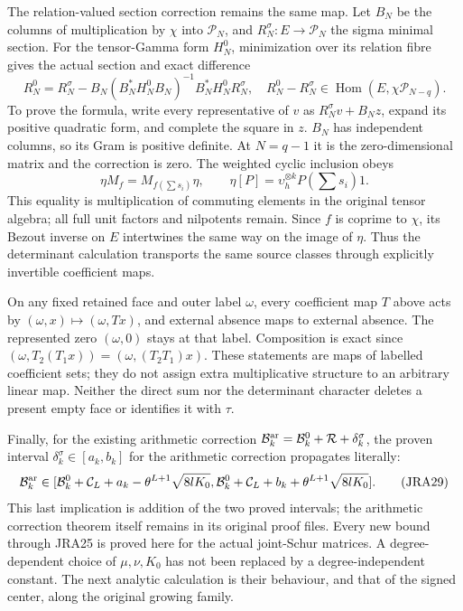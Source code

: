 \documentclass[11pt,a4paper]{article}
\begin{document}
The relation-valued section correction remains the same map.
Let $B_N$ be the columns of multiplication by $\chi$ into $\mathcal P_N$,
and $R_N^\sigma:E\to\mathcal P_N$ the sigma minimal section.
For the tensor-Gamma form $H_N^0$, minimization over its relation fibre
gives the actual section and exact difference
\begin{equation}
 R_N^0=R_N^\sigma-B_N(B_N^*H_N^0B_N)^{-1}B_N^*H_N^0R_N^\sigma,
 \quad
 R_N^0-R_N^\sigma\in\operatorname{Hom}(E,\chi\mathcal P_{N-q}).
 \tag{JRA27}
\end{equation}
To prove the formula, write every representative of $v$ as
$R_N^\sigma v+B_Nz$, expand its positive quadratic form, and complete
the square in $z$. $B_N$ has independent columns, so its Gram is
positive definite. At $N=q-1$ it is the zero-dimensional matrix and
the correction is zero. The weighted cyclic inclusion obeys
\begin{equation}
 \eta M_f=M_{f(\sum s_i)}\eta,\qquad
 \eta[P]=\upsilon_h^{\otimes k}P(\sum s_i)1.
 \tag{JRA28}
\end{equation}
This equality is multiplication of commuting elements in the original
tensor algebra; all full unit factors and nilpotents remain. Since
$f$ is coprime to $\chi$, its Bezout inverse on $E$ intertwines the same
way on the image of $\eta$. Thus the determinant calculation transports
the same source classes through explicitly invertible coefficient maps.

On any fixed retained face and outer label $\omega$, every coefficient
map $T$ above acts by $(\omega,x)\mapsto(\omega,Tx)$, and external absence
maps to external absence. The represented zero $(\omega,0)$ stays at
that label. Composition is exact since
$(\omega,T_2(T_1x))=(\omega,(T_2T_1)x)$.
These statements are maps of labelled coefficient sets; they do not
assign extra multiplicative structure to an arbitrary linear map.
Neither the direct sum nor the determinant character deletes a
present empty face or identifies it with $\tau$.

Finally, for the existing arithmetic correction
$\mathcal B_k^{\rm ar}=\mathcal B_k^0+\mathcal R+\delta_k^\sigma$,
the proven interval $\delta_k^\sigma\in[a_k,b_k]$ for the arithmetic
correction propagates literally:
\begin{equation}
 \mathcal B_k^{\rm ar}\in
 [\mathcal B_k^0+\mathcal C_L+a_k-\theta^{L+1}\sqrt{8lK_0},
  \mathcal B_k^0+\mathcal C_L+b_k+\theta^{L+1}\sqrt{8lK_0}].
 \tag{JRA29}
\end{equation}
This last implication is addition of the two proved intervals; the
arithmetic correction theorem itself remains in its original proof
files. Every new bound through JRA25 is proved here for the actual
joint-Schur matrices. A degree-dependent choice of $\mu,\nu,K_0$ has
not been replaced by a degree-independent constant. The next analytic
calculation is their behaviour, and that of the signed center, along
the original growing family.
\end{document}
